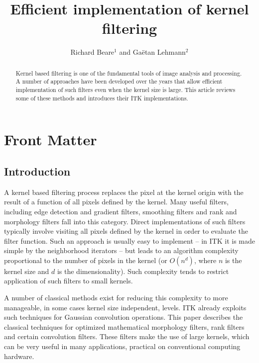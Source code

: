 \documentclass{InsightArticle}
\title{Efficient implementation of kernel filtering}
\author{Richard Beare{$^1$} {\small{and}} Ga\"etan Lehmann{$^2$}}
\begin{document}
\maketitle

\ifhtml
\chapter*{Front Matter\label{front}}
\fi


\begin{abstract}
\noindent
Kernel based filtering is one of the fundamental tools of image
analysis and processing. A number of approaches have been developed
over the years that allow efficient implementation of such filters
even when the kernel size is large. This article reviews some of these
methods and introduces their ITK implementations.
\end{abstract}

\tableofcontents

\section{Introduction}
A kernel based filtering process replaces the pixel at the kernel
origin with the result of a function of all pixels defined by
the kernel. Many useful filters, including edge detection and gradient
filters, smoothing filters and rank and morphology filters fall into
this category. Direct implementations of such filters typically
involve visiting all pixels defined by the kernel in order to evaluate
the filter function. Such an approach is usually easy to implement
-- in ITK it is made simple by the neighborhood iterators -- but leads
to an algorithm complexity proportional to the number of pixels in the
kernel (or $O(n^d)$, where $n$ is the kernel size and $d$ is the
dimensionality). Such complexity tends to restrict application of such
filters to small kernels.

A number of classical methods exist for reducing this complexity to
more manageable, in some cases kernel size independent, levels. ITK
already exploits such techniques for Gaussian convolution
operations. This paper describes the classical techniques for
optimized mathematical morphology filters, rank filters and certain
convolution filters. These filters make the use of large kernels,
which can be very useful in many applications, practical on
conventional computing hardware.
\end{document}
